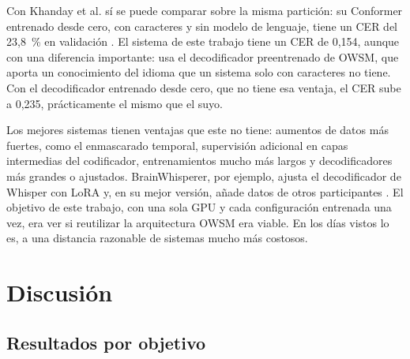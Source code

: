 Con Khanday et al. sí se puede comparar sobre la misma partición: su Conformer entrenado desde cero, con caracteres y sin modelo de lenguaje, tiene un CER del 23,8~\% en validación \cite{khanday2026}. El sistema de este trabajo tiene un CER de 0,154, aunque con una diferencia importante: usa el decodificador preentrenado de OWSM, que aporta un conocimiento del idioma que un sistema solo con caracteres no tiene. Con el decodificador entrenado desde cero, que no tiene esa ventaja, el CER sube a 0,235, prácticamente el mismo que el suyo.

Los mejores sistemas tienen ventajas que este no tiene: aumentos de datos más fuertes, como el enmascarado temporal, supervisión adicional en capas intermedias del codificador, entrenamientos mucho más largos y decodificadores más grandes o ajustados. BrainWhisperer, por ejemplo, ajusta el decodificador de Whisper con LoRA y, en su mejor versión, añade datos de otros participantes \cite{brainwhisperer}. El objetivo de este trabajo, con una sola GPU y cada configuración entrenada una vez, era ver si reutilizar la arquitectura OWSM era viable. En los días vistos lo es, a una distancia razonable de sistemas mucho más costosos.

\section{Discusión}
\label{sec:discusion}

\subsection{Resultados por objetivo}

